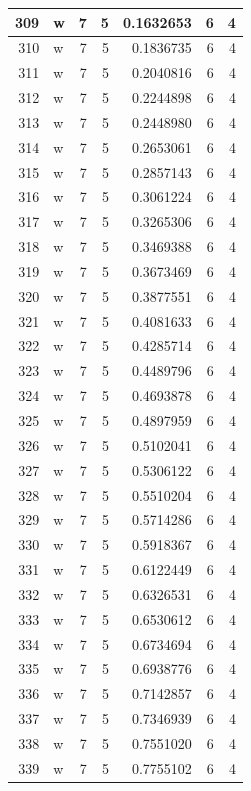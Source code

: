 \documentclass[
  letterpaper,
  DIV=11,
  numbers=noendperiod]{scrreprt}
\begin{document}
\begin{table}
\begin{tabular}[t]{r|l|r|r|r|r|r}
\hline
309 & w & 7 & 5 & 0.1632653 & 6 & 4\\
\hline
310 & w & 7 & 5 & 0.1836735 & 6 & 4\\
\hline
311 & w & 7 & 5 & 0.2040816 & 6 & 4\\
\hline
312 & w & 7 & 5 & 0.2244898 & 6 & 4\\
\hline
313 & w & 7 & 5 & 0.2448980 & 6 & 4\\
\hline
314 & w & 7 & 5 & 0.2653061 & 6 & 4\\
\hline
315 & w & 7 & 5 & 0.2857143 & 6 & 4\\
\hline
316 & w & 7 & 5 & 0.3061224 & 6 & 4\\
\hline
317 & w & 7 & 5 & 0.3265306 & 6 & 4\\
\hline
318 & w & 7 & 5 & 0.3469388 & 6 & 4\\
\hline
319 & w & 7 & 5 & 0.3673469 & 6 & 4\\
\hline
320 & w & 7 & 5 & 0.3877551 & 6 & 4\\
\hline
321 & w & 7 & 5 & 0.4081633 & 6 & 4\\
\hline
322 & w & 7 & 5 & 0.4285714 & 6 & 4\\
\hline
323 & w & 7 & 5 & 0.4489796 & 6 & 4\\
\hline
324 & w & 7 & 5 & 0.4693878 & 6 & 4\\
\hline
325 & w & 7 & 5 & 0.4897959 & 6 & 4\\
\hline
326 & w & 7 & 5 & 0.5102041 & 6 & 4\\
\hline
327 & w & 7 & 5 & 0.5306122 & 6 & 4\\
\hline
328 & w & 7 & 5 & 0.5510204 & 6 & 4\\
\hline
329 & w & 7 & 5 & 0.5714286 & 6 & 4\\
\hline
330 & w & 7 & 5 & 0.5918367 & 6 & 4\\
\hline
331 & w & 7 & 5 & 0.6122449 & 6 & 4\\
\hline
332 & w & 7 & 5 & 0.6326531 & 6 & 4\\
\hline
333 & w & 7 & 5 & 0.6530612 & 6 & 4\\
\hline
334 & w & 7 & 5 & 0.6734694 & 6 & 4\\
\hline
335 & w & 7 & 5 & 0.6938776 & 6 & 4\\
\hline
336 & w & 7 & 5 & 0.7142857 & 6 & 4\\
\hline
337 & w & 7 & 5 & 0.7346939 & 6 & 4\\
\hline
338 & w & 7 & 5 & 0.7551020 & 6 & 4\\
\hline
339 & w & 7 & 5 & 0.7755102 & 6 & 4\\

\end{tabular}
\end{table}
\end{document}
